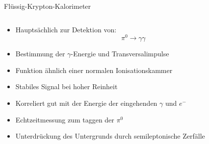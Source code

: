 \documentclass[aspectratio=1610, professionalfonts, 9pt, t]{beamer}
\begin{document}
\begin{frame}{Flüssig-Krypton-Kalorimeter}
\begin{columns}[onlytextwidth]
\begin{column}{0.5\textwidth}
\begin{itemize}
          \item Hauptsächlich zur Detektion von:
          \begin{equation*}
            \pi^0 \rightarrow \gamma \gamma
          \end{equation*}
          \item Bestimmung der $\gamma$-Energie und Transversalimpulse
          \item Funktion ähnlich einer normalen Ionisationskammer
          \item[\rightarrow] Stabiles Signal bei hoher Reinheit
          \item[\rightarrow] Korreliert gut mit der Energie der eingehenden $\gamma$ und $e^-$
          \item Echtzeitmessung zum taggen der $\pi^0$
          \item Unterdrückung des Untergrunds durch semileptonische Zerfälle %
        \end{itemize}
      \end{column}
    \end{columns}
  \end{frame}
\end{document}
